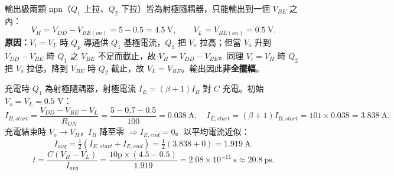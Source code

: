 \documentclass[12pt]{article}
\begin{document}
\begin{minipage}{0.62\linewidth}
\end{minipage}\hfill
\begin{minipage}{0.35\linewidth}
\end{minipage}

\sol 輸出級兩顆 npn（$Q_1$ 上拉、$Q_2$ 下拉）皆為射極隨耦器，只能輸出到一個 $V_{BE}$ 之內：
\[ V_H=V_{DD}-V_{BE(on)}=5-0.5=4.5\ \text{V},\qquad V_L=V_{BE(on)}=0.5\ \text{V}. \]
\textbf{原因：}$V_i=V_L$ 時 $Q_p$ 導通供 $Q_1$ 基極電流，$Q_1$ 把 $V_o$ 拉高；但當 $V_o$ 升到 $V_{DD}-V_{BE}$ 時 $Q_1$ 之 $V_{BE}$ 不足而截止，故 $V_H=V_{DD}-V_{BE}$。同理 $V_i=V_H$ 時 $Q_2$ 把 $V_o$ 拉低，降到 $V_{BE}$ 時 $Q_2$ 截止，故 $V_L=V_{BE}$。輸出因此\textbf{非全擺幅}。

\begin{minipage}{0.64\linewidth}
\end{minipage}\hfill
\begin{minipage}{0.33\linewidth}
\end{minipage}

\sol 充電時 $Q_1$ 為射極隨耦器，射極電流 $I_E=(\beta+1)I_B$ 對 $C$ 充電。初始 $V_o=V_L=0.5$ V：
\[ I_{B,start}=\frac{V_{DD}-V_{BE}-V_L}{R_{ON}}=\frac{5-0.7-0.5}{100}=0.038\ \text{A},\quad
   I_{E,start}=(\beta+1)I_{B,start}=101\times0.038=3.838\ \text{A}. \]
充電結束時 $V_o\to V_H$，$I_B$ 降至零 $\Rightarrow I_{E,end}=0$。以平均電流近似：
\[ I_{avg}=\tfrac12(I_{E,start}+I_{E,end})=\tfrac12(3.838+0)=1.919\ \text{A}. \]
\[ t=\frac{C(V_H-V_L)}{I_{avg}}=\frac{10\text{p}\times(4.5-0.5)}{1.919}=2.08\times10^{-11}\ \text{s}\approx20.8\ \text{ps}. \]

\begin{minipage}{0.64\linewidth}
\end{minipage}\hfill
\begin{minipage}{0.33\linewidth}
\end{minipage}
\end{document}
